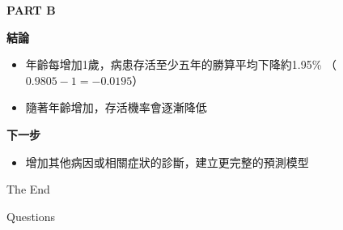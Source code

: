 \documentclass[12pt,aspectratio=43]{beamer}
\begin{document}
\begin{frame}[t]{\textbf{PART B}}
\vspace*{10pt}
{\Large \setlength{\baselineskip}{20pt} \parbox{\linewidth}{\raggedright \textbf{結論}}}
\begin{itemize}
    \item 年齡每增加1歲，病患存活至少五年的勝算平均下降約1.95\%
    （$0.9805-1=-0.0195$）
    \vspace*{10pt}
    \item 隨著年齡增加，存活機率會逐漸降低
\end{itemize}

\vspace*{30pt}

{\Large \setlength{\baselineskip}{20pt} \parbox{\linewidth}{\raggedright \textbf{下一步}}}
\begin{itemize}
\setlength{\itemsep}{10pt}
\item 增加其他病因或相關症狀的診斷，建立更完整的預測模型
\end{itemize}
\textbf{}

\end{frame}

\begin{frame}[plain] %
	\begin{center}
		{\Huge The End}
		\bigskip\bigskip 
		
		{\LARGE Questions}
	\end{center}
\end{frame}
\end{document}
